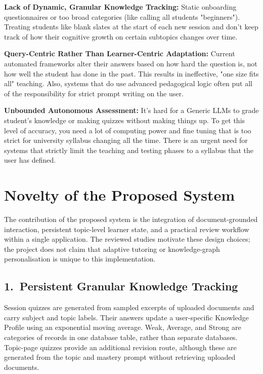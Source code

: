 \documentclass[11pt, a4paper, oneside]{report}
\begin{document}
\vspace{0.3cm}
\noindent\textbf{Lack of Dynamic, Granular Knowledge Tracking:} Static onboarding questionnaires or too broad categories (like calling all students "beginners"). Treating students like blank slates at the start of each new session and don't keep track of how their cognitive growth on certain subtopics changes over time.

\vspace{0.3cm}
\noindent\textbf{Query-Centric Rather Than Learner-Centric Adaptation:} Current automated frameworks alter their answers based on how hard the question is, not how well the student has done in the past. This results in ineffective, "one size fits all" teaching. Also, systems that do use advanced pedagogical logic often put all of the responsibility for strict prompt writing on the user.

\vspace{0.3cm}
\noindent\textbf{Unbounded Autonomous Assessment:} It’s hard for a Generic LLMs to grade student’s knowledge or making quizzes without making things up. To get this level of accuracy, you need a lot of computing power and fine tuning that is too strict for university syllabus changing all the time. There is an urgent need for systems that strictly limit the teaching and testing phases to a syllabus that the user has defined.

\section{Novelty of the Proposed System}

The contribution of the proposed system is the integration of document-grounded interaction, persistent topic-level learner state, and a practical review workflow within a single application. The reviewed studies motivate these design choices; the project does not claim that adaptive tutoring or knowledge-graph personalisation is unique to this implementation.

\subsection*{1.\ Persistent Granular Knowledge Tracking}
Session quizzes are generated from sampled excerpts of uploaded documents and carry subject and topic labels. Their answers update a user-specific Knowledge Profile using an exponential moving average. Weak, Average, and Strong are categories of records in one database table, rather than separate databases. Topic-page quizzes provide an additional revision route, although these are generated from the topic and mastery prompt without retrieving uploaded documents.
\end{document}
